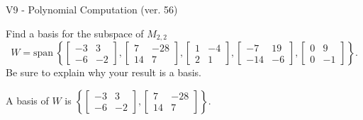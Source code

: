 \begin{exercise}
  \begin{exerciseTitle}V9 - Polynomial Computation (ver. 56)\end{exerciseTitle}
  \begin{exerciseStatement}
    Find a basis for the subspace of \(M_{2,2}\) 
\[W=\mathrm{span}\ \left\{\left[\begin{array}{cc}
-3 & 3 \\
-6 & -2
\end{array}\right] , \left[\begin{array}{cc}
7 & -28 \\
14 & 7
\end{array}\right] , \left[\begin{array}{cc}
1 & -4 \\
2 & 1
\end{array}\right] , \left[\begin{array}{cc}
-7 & 19 \\
-14 & -6
\end{array}\right] , \left[\begin{array}{cc}
0 & 9 \\
0 & -1
\end{array}\right]\right\}.\]
 Be sure to explain why your result is a basis.


  \end{exerciseStatement}
  \begin{exerciseAnswer}
   A basis of \(W\) is  \(\left\{\left[\begin{array}{cc}
-3 & 3 \\
-6 & -2
\end{array}\right] , \left[\begin{array}{cc}
7 & -28 \\
14 & 7
\end{array}\right]\right\}\).
  


  \end{exerciseAnswer}
\end{exercise}
